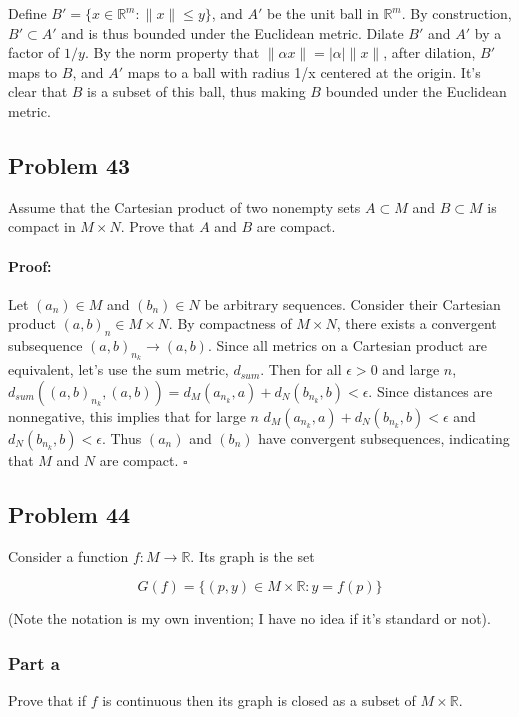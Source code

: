 \documentclass{article}
\newenvironment{proof}{\paragraph{Proof:}}{\hfill$\square$}
\begin{document}
Define $B' = \{x \in \mathbb{R}^m : \|x\| \leq y\}$, and $A'$ be the unit ball in $\mathbb{R}^m$. By construction, $B' \subset A'$ and is thus bounded under the Euclidean metric. Dilate $B'$ and $A'$ by a factor of $1/y$. By the norm property that $\|\alpha x \| = |\alpha| \|x\|$, after dilation, $B'$ maps to $B$, and $A'$ maps to a ball with radius 1/x centered at the origin. It's clear that $B$ is a subset of this ball, thus making $B$ bounded under the Euclidean metric.

\subsection*{Problem 43}
Assume that the Cartesian product of two nonempty sets $A \subset M$ and $B \subset M$ is compact in $M \times N$. Prove that $A$ and $B$ are compact.

\begin{proof}
Let $(a_n) \in M$ and $(b_n) \in N$ be arbitrary sequences. Consider their Cartesian product $(a, b)_n \in M \times N$. By compactness of $M \times N$, there exists a convergent subsequence $(a, b)_{n_k} \rightarrow (a, b)$. Since all metrics on a Cartesian product are equivalent, let's use the sum metric, $d_{sum}$. Then for all $\epsilon > 0$ and large $n$, $d_{sum}((a, b)_{n_k}, (a, b)) = d_M(a_{n_k}, a) + d_N(b_{n_k}, b) < \epsilon$. Since distances are nonnegative, this implies that for large $n$ $d_M(a_{n_k}, a) + d_N(b_{n_k}, b) < \epsilon$ and $d_N(b_{n_k}, b) < \epsilon$. Thus $(a_n)$ and $(b_n)$ have convergent subsequences, indicating that $M$ and $N$ are compact.
\end{proof}

\subsection*{Problem 44}

Consider a function $f: M \rightarrow \mathbb{R}$. Its graph is the set

\[
G(f) = \{(p, y) \in M \times \mathbb{R}: y = f(p) \}
\]

(Note the notation is my own invention; I have no idea if it's standard or not).

\subsubsection*{Part a}
Prove that if $f$ is continuous then its graph is closed as a subset of $M \times \mathbb{R}$.
\end{document}
